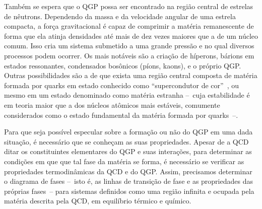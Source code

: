 
Também se espera que o QGP possa ser encontrado na região central de estrelas de nêutrons. Dependendo da massa e da velocidade angular de uma estrela compacta, a força gravitacional é capaz de comprimir a matéria remanescente de forma que ela atinja densidades até mais de dez vezes maiores que a de um núcleo comum. Isso cria um sistema submetido a uma grande pressão e no qual diversos processos podem ocorrer. Os mais notáveis são a criação de híperons, bárions em estados ressonantes, condensados bosônicos (píons, kaons), e o próprio QGP. Outras possibilidades são a de que exista uma região central composta de matéria formada por quarks em estado conhecido como ``supercondutor de cor''~\cite{Weber}, ou mesmo em um estado denominado como matéria estranha --~cuja estabilidade é em teoria maior que a dos núcleos atômicos mais estáveis, comumente considerados como o estado fundamental da matéria formada por quarks~--.


Para que seja possível especular sobre a formação ou não do QGP em uma dada situação, é necessário que se conheçam as suas propriedades. Apesar de a QCD ditar os constituintes elementares do QGP e suas interações, para determinar as condições em que que tal fase da matéria se forma, é necessário se verificar as propriedades termodinâmicas da QCD e do QGP. Assim, precisamos determinar o diagrama de fases --~isto é, as linhas de transição de fase e as propriedades das próprias fases~-- para sistemas definidos como uma região infinita e ocupada pela matéria descrita pela QCD, em equilíbrio térmico e químico.

